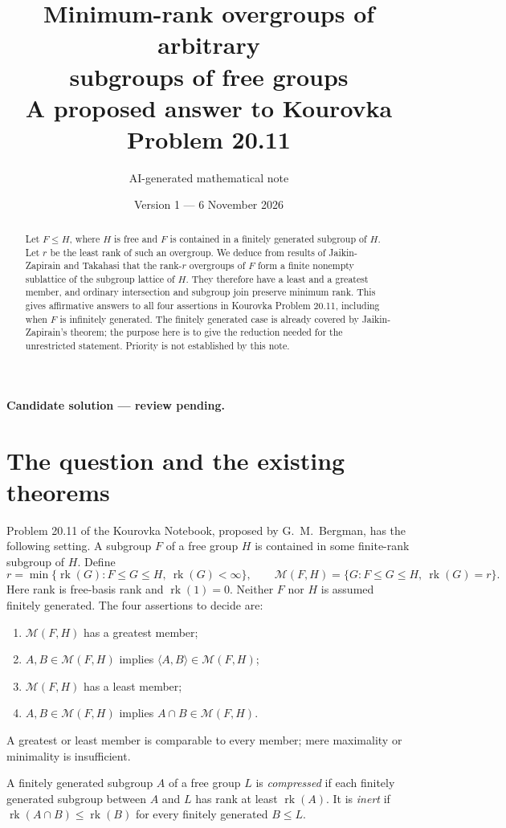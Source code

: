 \documentclass[11pt,a4paper]{article}
\title{Minimum-rank overgroups of arbitrary\protect\\ subgroups of free groups\protect\\[5pt]\large A proposed answer to Kourovka Problem 20.11}
\author{AI-generated mathematical note}
\date{Version 1 --- 6 November 2026}
\theoremstyle{remark}\newtheorem*{remark}{Remark}
\newcommand{\rk}{\operatorname{rk}}
\newcommand{\M}{\mathcal M}
\newcommand{\gen}[1]{\langle #1\rangle}
\begin{document}
\maketitle
\begin{center}\small\textbf{Candidate solution --- review pending.}\end{center}
\begin{abstract}
Let $F\le H$, where $H$ is free and $F$ is contained in a finitely generated subgroup of $H$. Let $r$ be the least rank of such an overgroup. We deduce from results of Jaikin-Zapirain and Takahasi that the rank-$r$ overgroups of $F$ form a finite nonempty sublattice of the subgroup lattice of $H$. They therefore have a least and a greatest member, and ordinary intersection and subgroup join preserve minimum rank. This gives affirmative answers to all four assertions in Kourovka Problem 20.11, including when $F$ is infinitely generated. The finitely generated case is already covered by Jaikin-Zapirain's theorem; the purpose here is to give the reduction needed for the unrestricted statement. Priority is not established by this note.
\end{abstract}

\section{The question and the existing theorems}
Problem 20.11 of the Kourovka Notebook, proposed by G.~M.~Bergman, has the following setting. A subgroup $F$ of a free group $H$ is contained in some finite-rank subgroup of $H$. Define
\[
r=\min\{\rk(G): F\le G\le H,\ \rk(G)<\infty\},\qquad
\M(F,H)=\{G:F\le G\le H,\ \rk(G)=r\}.
\]
Here rank is free-basis rank and $\rk(1)=0$. Neither $F$ nor $H$ is assumed finitely generated. The four assertions to decide are:
\begin{enumerate}[label=(\roman*)]
\item $\M(F,H)$ has a greatest member;
\item[$(\mathrm{i}')$] $A,B\in\M(F,H)$ implies $\gen{A,B}\in\M(F,H)$;
\item[$(\mathrm{ii})$] $\M(F,H)$ has a least member;
\item[$(\mathrm{ii}')$] $A,B\in\M(F,H)$ implies $A\cap B\in\M(F,H)$.
\end{enumerate}
A greatest or least member is comparable to every member; mere maximality or minimality is insufficient.

A finitely generated subgroup $A$ of a free group $L$ is \emph{compressed} if each finitely generated subgroup between $A$ and $L$ has rank at least $\rk(A)$. It is \emph{inert} if $\rk(A\cap B)\le\rk(B)$ for every finitely generated $B\le L$.
\end{document}
